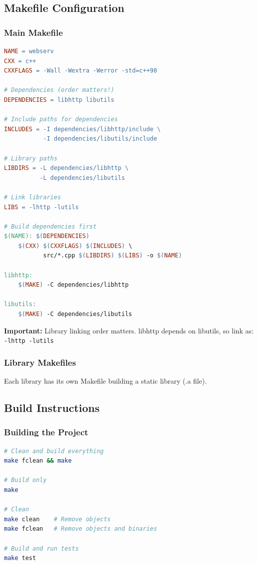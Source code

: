 \documentclass[11pt,a4paper]{article}
\begin{document}
\subsection{Makefile Configuration}

\subsubsection{Main Makefile}

\begin{lstlisting}[language=make, caption=Top-Level Makefile]
NAME = webserv
CXX = c++
CXXFLAGS = -Wall -Wextra -Werror -std=c++98

# Dependencies (order matters!)
DEPENDENCIES = libhttp libutils

# Include paths for dependencies
INCLUDES = -I dependencies/libhttp/include \
           -I dependencies/libutils/include

# Library paths
LIBDIRS = -L dependencies/libhttp \
          -L dependencies/libutils

# Link libraries
LIBS = -lhttp -lutils

# Build dependencies first
$(NAME): $(DEPENDENCIES)
	$(CXX) $(CXXFLAGS) $(INCLUDES) \
	       src/*.cpp $(LIBDIRS) $(LIBS) -o $(NAME)

libhttp:
	$(MAKE) -C dependencies/libhttp

libutils:
	$(MAKE) -C dependencies/libutils
\end{lstlisting}

\textbf{Important:} Library linking order matters. libhttp depends on libutils, so link as: \texttt{-lhttp -lutils}

\subsubsection{Library Makefiles}

Each library has its own Makefile building a static library (.a file).

\subsection{Build Instructions}

\subsubsection{Building the Project}

\begin{lstlisting}[language=bash, caption=Build Commands]
# Clean and build everything
make fclean && make

# Build only
make

# Clean
make clean    # Remove objects
make fclean   # Remove objects and binaries

# Build and run tests
make test
\end{lstlisting}
\end{document}
